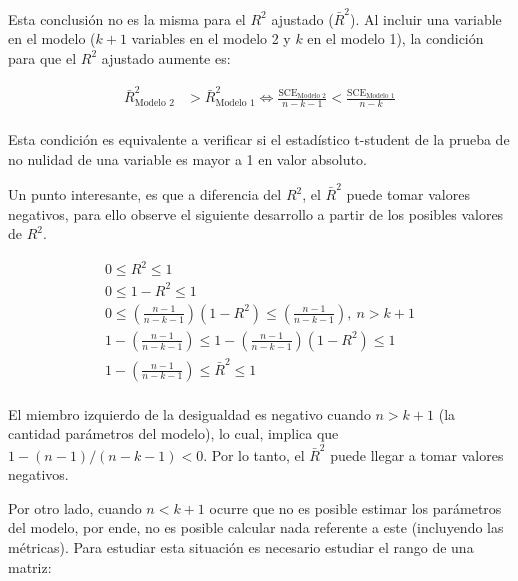 \documentclass[
  11pt,
]{book}
\theoremstyle{definition}
\theoremstyle{definition}
\theoremstyle{definition}
\theoremstyle{definition}
\theoremstyle{remark}
\begin{document}
Esta conclusión no es la misma para el \(R^2\) ajustado (\(\bar{R}^2\)). Al incluir una variable en el modelo (\(k+1\) variables en el modelo 2 y \(k\) en el modelo 1), la condición para que el \(R^2\) ajustado aumente es:

\begin{equation}
\begin{split}
\bar{R}^2_{\text{Modelo 2}} &> \bar{R}^2_{\text{Modelo 1}} \Leftrightarrow \frac{\text{SCE}_{\text{Modelo 2}}}{n-k-1} < \frac{\text{SCE}_{\text{Modelo 1}}}{n-k}\\
\end{split}
\label{eq:igualacion-modelos4}
\end{equation}

Esta condición es equivalente a verificar si el estadístico t-student de la prueba de no nulidad de una variable es mayor a 1 en valor absoluto.

Un punto interesante, es que a diferencia del \(R^2\), el \(\bar{R}^2\) puede tomar valores negativos, para ello observe el siguiente desarrollo a partir de los posibles valores de \(R^2\).

\begin{gather*}
0 \leq R^2 \leq 1\\
0 \leq 1 - R^2 \leq 1\\
0 \leq \left( \frac{n-1}{n-k-1} \right) (1 - R^2) \leq \left( \frac{n-1}{n-k-1} \right), \ n > k+1\\
1 - \left( \frac{n-1}{n-k-1} \right) \leq 1 - \left( \frac{n-1}{n-k-1} \right) (1 - R^2) \leq 1\\
1 - \left( \frac{n-1}{n-k-1} \right) \leq \bar{R}^2 \leq 1\\
\label{eq:igualacion-modelos5}
\end{gather*}

El miembro izquierdo de la desigualdad es negativo cuando \(n > k+1\) (la cantidad parámetros del modelo), lo cual, implica que \(1-(n-1)/(n-k-1) < 0\). Por lo tanto, el \(\bar{R}^2\) puede llegar a tomar valores negativos.

Por otro lado, cuando \(n < k+1\) ocurre que no es posible estimar los parámetros del modelo, por ende, no es posible calcular nada referente a este (incluyendo las métricas). Para estudiar esta situación es necesario estudiar el rango de una matriz:
\end{document}

